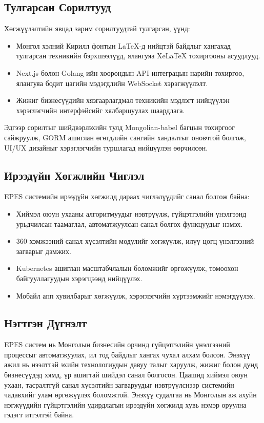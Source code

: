 \subsection{Тулгарсан Сорилтууд}
Хөгжүүлэлтийн явцад зарим сорилтуудтай тулгарсан, үүнд:
\begin{itemize}
    \item Монгол хэлний Кирилл фонтын LaTeX-д нийцтэй байдлыг хангахад тулгарсан техникийн бэрхшээлүүд, ялангуяа XeLaTeX тохиргооны асуудлууд.
    \item Next.js болон Golang-ийн хоорондын API интеграцын нарийн тохиргоо, ялангуяа бодит цагийн мэдэгдлийн WebSocket хэрэгжүүлэлт.
    \item Жижиг бизнесүүдийн хязгаарлагдмал техникийн мэдлэгт нийцүүлэн хэрэглэгчийн интерфэйсийг хялбаршуулах шаардлага.
\end{itemize}
Эдгээр сорилтыг шийдвэрлэхийн тулд Mongolian-babel багцын тохиргоог сайжруулж, GORM ашиглан өгөгдлийн сангийн хандалтыг оновчтой болгож, UI/UX дизайныг хэрэглэгчийн туршлагад нийцүүлэн өөрчилсөн.

\subsection{Ирээдүйн Хөгжлийн Чиглэл}
EPES системийн ирээдүйн хөгжилд дараах чиглэлүүдийг санал болгож байна:
\begin{itemize}
    \item Хиймэл оюун ухааны алгоритмуудыг нэвтрүүлж, гүйцэтгэлийн үнэлгээнд урьдчилсан таамаглал, автоматжуулсан санал болгох функцуудыг нэмэх.
    \item 360 хэмжээний санал хүсэлтийн модулийг хөгжүүлж, илүү цогц үнэлгээний загварыг дэмжих.
    \item Kubernetes ашиглан масштабчлалын боломжийг өргөжүүлж, томоохон байгууллагуудын хэрэгцээнд нийцүүлэх.
    \item Мобайл апп хувилбарыг хөгжүүлж, хэрэглэгчийн хүртээмжийг нэмэгдүүлэх.
\end{itemize}

\subsection{Нэгтгэн Дүгнэлт}
EPES систем нь Монголын бизнесийн орчинд гүйцэтгэлийн үнэлгээний процессыг автоматжуулах, ил тод байдлыг хангах чухал алхам болсон. Энэхүү ажил нь нээлттэй эхийн технологиудын давуу талыг харуулж, жижиг болон дунд бизнесүүдэд хямд, үр ашигтай шийдэл санал болгосон. Цаашид хиймэл оюун ухаан, тасралтгүй санал хүсэлтийн загваруудыг нэвтрүүлснээр системийн чадавхийг улам өргөжүүлэх боломжтой. Энэхүү судалгаа нь Монголын аж ахуйн нэгжүүдийн гүйцэтгэлийн удирдлагын ирээдүйн хөгжилд хувь нэмэр оруулна гэдэгт итгэлтэй байна.